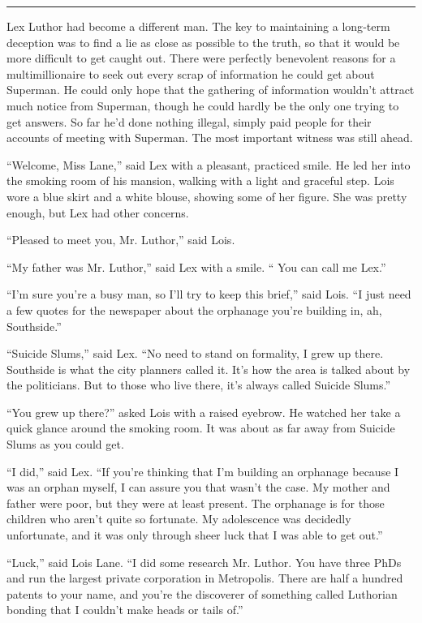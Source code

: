 \documentclass[ebook,12pt]{memoir}
\begin{document}
\begin{center}\rule{0.5\linewidth}{\linethickness}\end{center}

Lex Luthor had become a different man. The key to maintaining a
long‐term deception was to find a lie as close as possible to the truth,
so that it would be more difficult to get caught out. There were
perfectly benevolent reasons for a multimillionaire to seek out every
scrap of information he could get about Superman. He could only hope
that the gathering of information wouldn't attract much notice from
Superman, though he could hardly be the only one trying to get answers.
So far he'd done nothing illegal, simply paid people for their accounts
of meeting with Superman. The most important witness was still ahead.

``Welcome, Miss Lane,'' said Lex with a pleasant, practiced smile. He
led her into the smoking room of his mansion, walking with a light and
graceful step. Lois wore a blue skirt and a white blouse, showing some
of her figure. She was pretty enough, but Lex had other concerns.

``Pleased to meet you, Mr. Luthor,'' said Lois.

``My father was Mr. Luthor,'' said Lex with a smile. `` You can call me
Lex.''

``I'm sure you're a busy man, so I'll try to keep this brief,'' said
Lois. ``I just need a few quotes for the newspaper about the orphanage
you're building in, ah, Southside.''

``Suicide Slums,'' said Lex. ``No need to stand on formality, I grew up
there. Southside is what the city planners called it. It's how the area
is talked about by the politicians. But to those who live there, it's
always called Suicide Slums.''

``You grew up there?'' asked Lois with a raised eyebrow. He watched her
take a quick glance around the smoking room. It was about as far away
from Suicide Slums as you could get.

``I did,'' said Lex. ``If you're thinking that I'm building an orphanage
because I was an orphan myself, I can assure you that wasn't the case.
My mother and father were poor, but they were at least present. The
orphanage is for those children who aren't quite so fortunate. My
adolescence was decidedly unfortunate, and it was only through sheer
luck that I was able to get out.''

``Luck,'' said Lois Lane. ``I did some research Mr. Luthor. You have
three PhDs and run the largest private corporation in Metropolis. There
are half a hundred patents to your name, and you're the discoverer of
something called Luthorian bonding that I couldn't make heads or tails
of.''
\end{document}
